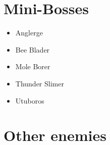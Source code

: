 \section{Mini-Bosses}
	\begin{itemize}
		\item \hypertarget{miniboss:Anglerge}{Anglerge}
		\item \hypertarget{miniboss:Bee_Blader}{Bee Blader}
		\item \hypertarget{miniboss:Mole_Borer}{Mole Borer}
		\item \hypertarget{miniboss:Thunder_Slimer}{Thunder Slimer}
		\item \hypertarget{miniboss:Utuboros}{Utuboros}
	\end{itemize}

\section{Other enemies}
